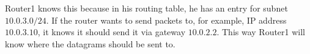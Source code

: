 Router1 knows this because in his routing table, he has an entry for subnet $10.0.3.0/24$. If the router wants to send packets to, for example, IP address $10.0.3.10$, it knows it should send it via gateway $10.0.2.2$. This way Router1 will know where the datagrams should be sent to.